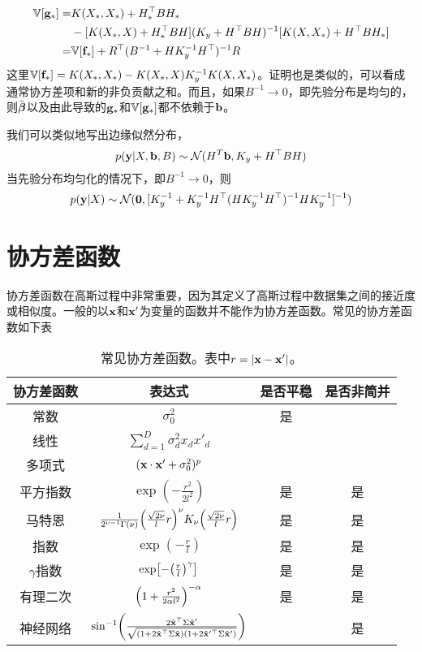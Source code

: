 \documentclass[12pt,UTF8]{article}
\begin{document}
            \begin{align}
                \mathbb{V}[\vb{g}_*]=&K(X_*,X_*)+H_*^\top BH_* \nonumber \\
                &-[K(X_*,X)+H_*^\top BH](K_y+H^\top BH)^{-1}[K(X,X_*)+H^\top BH_*] \\
                =&\mathbb{V}[\vb{f}_*]+R^\top(B^{-1}+HK_y^{-1}H^\top)^{-1}R
            \end{align}
            这里$\mathbb{V}[\vb{f}_*]=K(X_*,X_*)-K(X_*,X)K_y^{-1}K(X,X_*)$。证明也是类似的，可以看成通常协方差项和新的非负贡献之和。而且，如果$B^{-1}\rightarrow 0$，即先验分布是均匀的，则$\bar{\vb*{\beta}}$以及由此导致的$\vb{g}_*$和$\mathbb{V}[\vb{g}_*]$都不依赖于$\vb{b}$。\par
            我们可以类似地写出边缘似然分布，
            \begin{equation}
                p(\vb{y}|X,\vb{b},B)\sim\mathcal{N}(H^T\vb{b},K_y+H^\top BH)
            \end{equation}
            当先验分布均匀化的情况下，即$B^{-1}\rightarrow 0$，则
            \begin{equation}
                p(\vb{y}|X)\sim\mathcal{N}(\vb{0},[K_y^{-1}+K_y^{-1}H^\top(HK_y^{-1}H^\top)^{-1}HK_y^{-1}]^{-1})
            \end{equation}

    \section{协方差函数}
        协方差函数在高斯过程中非常重要，因为其定义了高斯过程中数据集之间的接近度或相似度。一般的以$\vb{x}$和$\vb{x}'$为变量的函数并不能作为协方差函数。常见的协方差函数如下表
        \begin{table}[!hbtp]
            \small
            \centering
            \begin{tabular}{c|c|cc}
                \toprule
                协方差函数&表达式&是否平稳&是否非简并\\
                \midrule
                常数&$\sigma_0^2$&是&\\
                线性&$\sum_{d=1}^D{\sigma_d^2x_dx'_d}$&&\\
                多项式&$(\vb{x}\cdot\vb{x}'+\sigma_0^2)^p$&&\\
                平方指数&$\exp(-\frac{r^2}{2l^2})$&是&是\\
                马特恩&$\frac{1}{2^{\nu-1}\Gamma(\nu)}\qty(\frac{\sqrt{2\nu}}{l}r)^\nu K_{\nu}\qty(\frac{\sqrt{2\nu}}{l}r)$&是&是\\
                指数&$\exp(-\frac{r}{l})$&是&是\\
                $\gamma$指数&$\exp[-\qty(\frac{r}{l})^\gamma]$&是&是\\
                有理二次&$\qty(1+\frac{r^2}{2\alpha l^2})^{-\alpha}$&是&是\\
                神经网络&$\sin[-1](\frac{2\tilde{\vb{x}}^\top\Sigma\tilde{\vb{x}}'}{\sqrt{(1+2\tilde{\vb{x}}^\top\Sigma\tilde{\vb{x}})(1+2\tilde{\vb{x}}'^\top\Sigma\tilde{\vb{x}}')}})$&&是\\
                \bottomrule
            \end{tabular}
            \caption{常见协方差函数。表中$r=\abs{\vb{x}-\vb{x}'}$。}
        \end{table}
\end{document}
